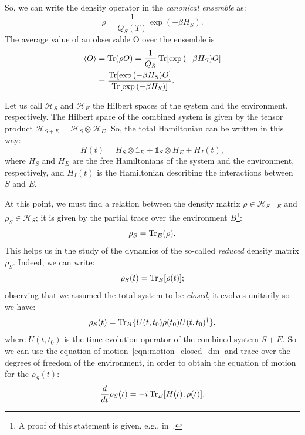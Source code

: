 So, we can write the density operator in the \emph{canonical ensemble} as:
\begin{equation}
    \rho = \frac{1}{Q_S(T)} \exp{(-\beta H_S)}.
\end{equation}
The average value of an observable O over the ensemble is 
\begin{equation}
\begin{split}
    \langle O \rangle &= \operatorname{Tr}(\rho O) = \frac{1}{Q_S} \operatorname{Tr}[\exp{(-\beta H_S)}O] \\
                      &= \frac{\operatorname{Tr}[\exp{(-\beta H_S)}O]}{\operatorname{Tr}[\exp{(-\beta H_S)}]}.
\end{split}
\end{equation}

Let us call $\mathcal{H}_S$ and $\mathcal{H}_E$ the Hilbert spaces of the system and the environment, respectively. The Hilbert space of the combined system is given by the tensor product $\mathcal{H}_{S+E} = \mathcal{H}_S \otimes \mathcal{H}_E$. So, the total Hamiltonian can be written in this way:
\begin{equation}
    H(t) = H_S \otimes \mathds{1}_E + \mathds{1}_S \otimes H_E + H_I(t),
\end{equation}
where $H_S$ and $H_E$ are the free Hamiltonians of the system and the environment, respectively, and $H_I(t)$ is the Hamiltonian describing the interactions between $S$ and $E$.

At this point, we must find a relation between the density matrix $\rho \in \mathcal{H}_{S+E}$ and $\rho_S \in \mathcal{H}_S$; it is given by the partial trace over the environment $B$\footnote{A proof of this statement is given, e.g., in~\cite{nielsen_chuang}.}:
\begin{equation}
    \rho_S = \operatorname{Tr}_E(\rho).
\end{equation}
This helps us in the study of the dynamics of the so-called \emph{reduced} density matrix $\rho_S$. Indeed, we can write:
\begin{equation}
    \rho_S(t) = \operatorname{Tr}_E[\rho(t)];
\end{equation}
observing that we assumed the total system to be \emph{closed}, it evolves unitarily so we have:
\begin{equation}
    \rho_S(t) = \operatorname{Tr}_B\{U(t, t_0)\rho(t_0)U(t, t_0)^\dagger\},
\end{equation}
where $U(t, t_0)$ is the time-evolution operator of the combined system $S+E$. So we can use the equation of motion~\ref{eqn:motion_closed_dm} and trace over the degrees of freedom of the environment, in order to obtain the equation of motion for the $\rho_S(t)$:
\begin{equation}
\label{eqn:motion_open}
    \frac{d}{dt}\rho_S(t) = -i \operatorname{Tr}_B[H(t), \rho(t)].
\end{equation}


